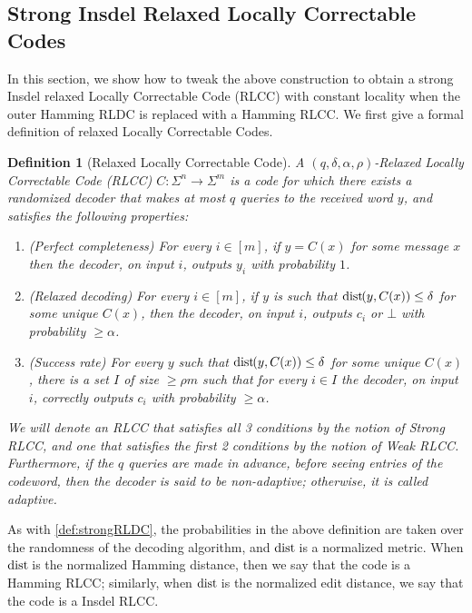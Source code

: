 \documentclass[10pt,a4paper]{article}
\newtheorem{definition}{Definition}
\theoremstyle{remark}
\newcommand{\dist}{\mathrm{dist}\hspace{-1pt}}
\newcommand{\authnote}[3]{\textcolor{#2}{{\sf (#1's Note: {\sl{#3}})}}}
\newcommand{\alex}[1]{\authnote{Alex}{orange}{#1}}
\newcommand{\authnote}{}
\newcommand{\alex}[1]{}
\begin{document}
\subsection{Strong Insdel Relaxed Locally Correctable Codes}\label{sec:rLCC}

In this section, we show how to tweak the above construction to obtain a strong Insdel relaxed Locally Correctable Code (RLCC) with constant locality when the outer Hamming RLDC is replaced with a Hamming RLCC. 
We first give a formal definition of relaxed Locally Correctable Codes.

\begin{definition}[Relaxed Locally Correctable Code]\label{def:rLCC}
    A $(q,\delta,\alpha,\rho)$-Relaxed Locally Correctable Code (RLCC) $C \colon \Sigma^n \rightarrow \Sigma^m$ is a code for which there exists a randomized decoder that makes at most $q$ queries to the received word $y$, and satisfies the following properties:
    \begin{enumerate}
        \item (Perfect completeness) For every $i \in [m]$, if $y = C(x)$ for some message $x$ then the decoder, on input $i$, outputs $y_i$ with probability $1$.
        
        \item (Relaxed decoding) For every $i \in [m]$, if $y$ is such that $\dist(y, C(x)) \leq \delta$ for some unique $C(x)$, then the decoder, on input $i$, outputs $c_i$ or $\bot$ with probability $\geq \alpha$.
        
        \item (Success rate) For every $y$ such that $\dist(y, C(x)) \leq \delta$ for some unique $C(x)$, there is a set $I$ of size $\geq \rho m$ such that for every $i \in I$ the decoder, on input $i$, correctly outputs $c_i$ with probability $\geq \alpha$.
    \end{enumerate}
    We will denote an RLCC that satisfies all 3 conditions by the notion of Strong RLCC, and one that satisfies the first 2 conditions by the notion of Weak RLCC. Furthermore,  if the $q$ queries are made in advance, before seeing entries of the codeword, then the decoder is said to be {\em non-adaptive}; otherwise, it is called {\em adaptive}.
\end{definition}
As with \cref{def:strongRLDC}, the probabilities in the above definition are taken over the randomness  of the decoding algorithm, and $\dist$ is a normalized metric.
When $\dist$ is the normalized Hamming distance, then we say that the code is a Hamming RLCC; similarly, when $\dist$ is the normalized edit distance, we say that the code is a Insdel RLCC.
\end{document}
